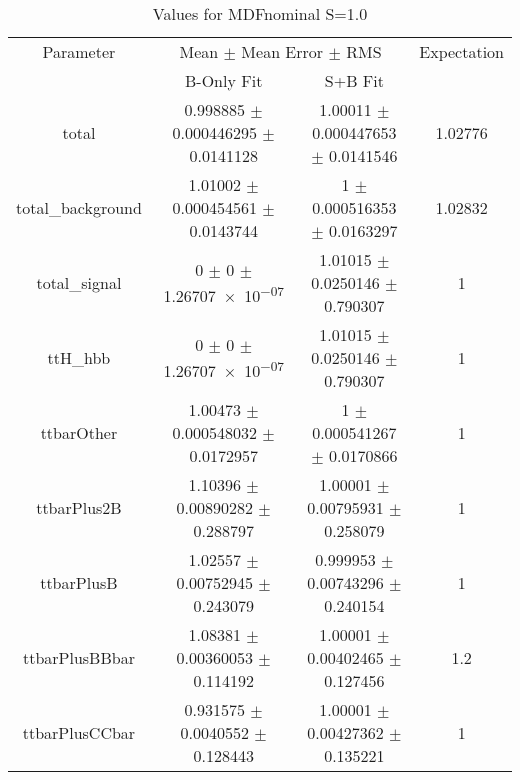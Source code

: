 \begin{table}
\centering
\caption{Values for MDFnominal S=1.0}
\begin{tabular}{cccc}
\toprule
Parameter & \multicolumn{2}{c}{Mean $\pm$ Mean Error $\pm$ RMS} & Expectation\\
 & B-Only Fit & S+B Fit & \\
\midrule
total & \num{0.998885} $\pm$ \num{0.000446295} $\pm$ \num{0.0141128} & \num{1.00011} $\pm$ \num{0.000447653} $\pm$ \num{0.0141546} & \num{1.02776}\\
total\_background & \num{1.01002} $\pm$ \num{0.000454561} $\pm$ \num{0.0143744} & \num{1} $\pm$ \num{0.000516353} $\pm$ \num{0.0163297} & \num{1.02832}\\
total\_signal & \num{0} $\pm$ \num{0} $\pm$ \num{1.26707e-07} & \num{1.01015} $\pm$ \num{0.0250146} $\pm$ \num{0.790307} & \num{1}\\
ttH\_hbb & \num{0} $\pm$ \num{0} $\pm$ \num{1.26707e-07} & \num{1.01015} $\pm$ \num{0.0250146} $\pm$ \num{0.790307} & \num{1}\\
ttbarOther & \num{1.00473} $\pm$ \num{0.000548032} $\pm$ \num{0.0172957} & \num{1} $\pm$ \num{0.000541267} $\pm$ \num{0.0170866} & \num{1}\\
ttbarPlus2B & \num{1.10396} $\pm$ \num{0.00890282} $\pm$ \num{0.288797} & \num{1.00001} $\pm$ \num{0.00795931} $\pm$ \num{0.258079} & \num{1}\\
ttbarPlusB & \num{1.02557} $\pm$ \num{0.00752945} $\pm$ \num{0.243079} & \num{0.999953} $\pm$ \num{0.00743296} $\pm$ \num{0.240154} & \num{1}\\
ttbarPlusBBbar & \num{1.08381} $\pm$ \num{0.00360053} $\pm$ \num{0.114192} & \num{1.00001} $\pm$ \num{0.00402465} $\pm$ \num{0.127456} & \num{1.2}\\
ttbarPlusCCbar & \num{0.931575} $\pm$ \num{0.0040552} $\pm$ \num{0.128443} & \num{1.00001} $\pm$ \num{0.00427362} $\pm$ \num{0.135221} & \num{1}\\
\bottomrule
\end{tabular}
\end{table}